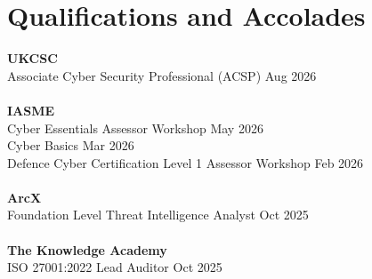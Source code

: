 \section*{Qualifications and Accolades}
\noindent
\textbf{UKCSC}\\
Associate Cyber Security Professional (ACSP) \hfill Aug 2026\\
\\
\textbf{IASME}\\
Cyber Essentials Assessor Workshop \hfill May 2026\\
Cyber Basics \hfill Mar 2026\\
Defence Cyber Certification Level 1 Assessor Workshop \hfill Feb 2026\\
\\
\textbf{ArcX}\\
Foundation Level Threat Intelligence Analyst \hfill Oct 2025\\
\\
\textbf{The Knowledge Academy}\\
ISO 27001:2022 Lead Auditor \hfill Oct 2025


